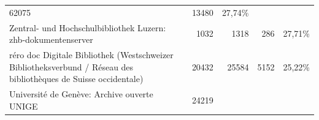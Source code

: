 \documentclass[a4paper,
fontsize=11pt,
oneside,
numbers=noperiodatend,
parskip=half-,
bibliography=totoc,
final
]{scrartcl}
\begin{document}
\begin{longtable}[c]{@{}lrrrr@{}}
\begin{minipage}[t]{0.16\columnwidth}
62075
\strut\end{minipage} &
\begin{minipage}[t]{0.14\columnwidth}\raggedleft\strut
13480
\strut\end{minipage} &
\begin{minipage}[t]{0.14\columnwidth}\raggedleft\strut
27,74\%
\strut\end{minipage}\tabularnewline
\begin{minipage}[t]{0.25\columnwidth}\raggedright\strut
Zentral- und Hochschulbibliothek Luzern: zhb-dokumentenserver
\strut\end{minipage} &
\begin{minipage}[t]{0.16\columnwidth}\raggedleft\strut
1032
\strut\end{minipage} &
\begin{minipage}[t]{0.16\columnwidth}\raggedleft\strut
1318
\strut\end{minipage} &
\begin{minipage}[t]{0.14\columnwidth}\raggedleft\strut
286
\strut\end{minipage} &
\begin{minipage}[t]{0.14\columnwidth}\raggedleft\strut
27,71\%
\strut\end{minipage}\tabularnewline
\begin{minipage}[t]{0.25\columnwidth}\raggedright\strut
réro doc Digitale Bibliothek (Westschweizer Bibliotheksverbund / Réseau
des bibliothèques de Suisse occidentale)
\strut\end{minipage} &
\begin{minipage}[t]{0.16\columnwidth}\raggedleft\strut
20432
\strut\end{minipage} &
\begin{minipage}[t]{0.16\columnwidth}\raggedleft\strut
25584
\strut\end{minipage} &
\begin{minipage}[t]{0.14\columnwidth}\raggedleft\strut
5152
\strut\end{minipage} &
\begin{minipage}[t]{0.14\columnwidth}\raggedleft\strut
25,22\%
\strut\end{minipage}\tabularnewline
\begin{minipage}[t]{0.25\columnwidth}\raggedright\strut
Université de Genève: Archive ouverte UNIGE
\strut\end{minipage} &
\begin{minipage}[t]{0.16\columnwidth}\raggedleft\strut
24219
\strut\end{minipage} &

\end{longtable}
\end{document}
